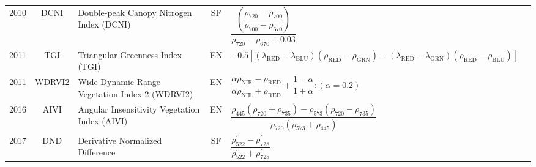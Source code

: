 \documentclass[10pt]{article}
\begin{document}
\begin{ThreePartTable}
\begin{longtable}{c c m{2.3in} c M{2.8in} M{1.5in}}
  2010 & DCNI    & Double-peak Canopy Nitrogen Index (DCNI)                                       & SF & $\dfrac{\left(\dfrac{\rho_{720}-\rho_{700}}{\rho_{700}-\rho_{670}}\right)}{\rho_{720}-\rho_{670}+0.03}$                                                                                                                                                                                 & \citet{Chen2010}                                    \\
  2011 & TGI     & Triangular Greenness Index (TGI)                                               & EN & $-0.5[(\lambda_\text{RED}-\lambda_\text{BLU})(\rho_\text{RED}-\rho_\text{GRN})-(\lambda_\text{RED}-\lambda_\text{GRN})(\rho_\text{RED}-\rho_\text{BLU})]$                                                                                                                               & \citet{Hunt2011}                                    \\
  2011 & WDRVI2  & Wide Dynamic Range Vegetation Index 2 (WDRVI2)                                 & EN & $\dfrac{\alpha\rho_\text{NIR}-\rho_\text{RED}}{\alpha\rho_\text{NIR}+\rho_\text{RED}}+\dfrac{1-\alpha}{1+\alpha} : (\alpha=0.2)$                                                                                                                                                        & \citet{Peng2011}                                    \\
  2016 & AIVI    & Angular Insensitivity Vegetation Index (AIVI)                                  & EN & $\dfrac{\rho_{445}(\rho_{720}+\rho_{735})-\rho_{573}(\rho_{720}-\rho_{735})}{\rho_{720}(\rho_{573}+\rho_{445})}$                                                                                                                                                                        & \citet{He2016}                                      \\
  2017 & DND     & Derivative Normalized Difference                                               & SF & $\dfrac{\rho^\prime_{522}-\rho^\prime_{728}}{\rho^\prime_{522}+\rho^\prime_{728}}$                                                                                                                                                                                                      & \citet{Sonobe2017}                                  \\
\end{longtable}
\end{ThreePartTable}
\endgroup
\end{document}
